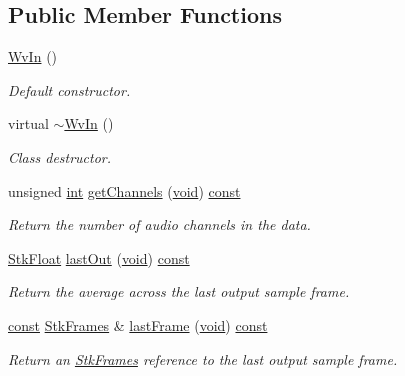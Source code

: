 \subsection*{Public Member Functions}
\begin{DoxyCompactItemize}
\item 
\hyperlink{class_nyq_1_1_wv_in_a925a279554d487103e6669f218347f6f}{Wv\+In} ()
\begin{DoxyCompactList}\small\item\em Default constructor. \end{DoxyCompactList}\item 
virtual \hyperlink{class_nyq_1_1_wv_in_adb6c87896b5b12e71a064ca69ed04c7c}{$\sim$\+Wv\+In} ()
\begin{DoxyCompactList}\small\item\em Class destructor. \end{DoxyCompactList}\item 
unsigned \hyperlink{xmltok_8h_a5a0d4a5641ce434f1d23533f2b2e6653}{int} \hyperlink{class_nyq_1_1_wv_in_a84e5cfb2bb965e095b0968f412503ff5}{get\+Channels} (\hyperlink{sound_8c_ae35f5844602719cf66324f4de2a658b3}{void}) \hyperlink{getopt1_8c_a2c212835823e3c54a8ab6d95c652660e}{const} 
\begin{DoxyCompactList}\small\item\em Return the number of audio channels in the data. \end{DoxyCompactList}\item 
\hyperlink{namespace_nyq_a044fa20a706520a617bbbf458a7db7e4}{Stk\+Float} \hyperlink{class_nyq_1_1_wv_in_aec50937de8d12ed6bc8d2688be10acf6}{last\+Out} (\hyperlink{sound_8c_ae35f5844602719cf66324f4de2a658b3}{void}) \hyperlink{getopt1_8c_a2c212835823e3c54a8ab6d95c652660e}{const} 
\begin{DoxyCompactList}\small\item\em Return the average across the last output sample frame. \end{DoxyCompactList}\item 
\hyperlink{getopt1_8c_a2c212835823e3c54a8ab6d95c652660e}{const} \hyperlink{class_nyq_1_1_stk_frames}{Stk\+Frames} \& \hyperlink{class_nyq_1_1_wv_in_aabfa6a05f2642b17e9ba9f143c6b5026}{last\+Frame} (\hyperlink{sound_8c_ae35f5844602719cf66324f4de2a658b3}{void}) \hyperlink{getopt1_8c_a2c212835823e3c54a8ab6d95c652660e}{const} 
\begin{DoxyCompactList}\small\item\em Return an \hyperlink{class_nyq_1_1_stk_frames}{Stk\+Frames} reference to the last output sample frame. \end{DoxyCompactList}\item 

\end{DoxyCompactItemize}

